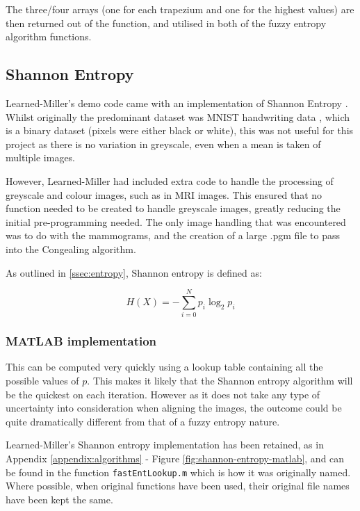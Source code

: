 The three/four arrays (one for each trapezium and one for the highest values) are then returned out of the function, and utilised in both of the fuzzy entropy algorithm functions.

\newpage
\subsection{Shannon Entropy}
\label{ssec:shannon-entropy}

Learned-Miller's demo code came with an implementation of Shannon Entropy \cite{joint-alignment}. Whilst originally the predominant dataset was MNIST handwriting data \cite{lecun1998gradientbased}, which is a binary dataset (pixels were either black or white), this was not useful for this project as there is no variation in greyscale, even when a mean is taken of multiple images.

However, Learned-Miller had included extra code to handle the processing of greyscale and colour images, such as in MRI images. This ensured that no function needed to be created to handle greyscale images, greatly reducing the initial pre-programming needed. The only image handling that was encountered was to do with the mammograms, and the creation of a large .pgm file to pass into the \Gls{Congealing} algorithm.

As outlined in \ref{ssec:entropy}, Shannon entropy is defined as:

\begin{equation}
  H(X) = - \displaystyle\sum_{i=0}^{N}{p_i \log_2 p_i}
\end{equation}

\subsubsection{MATLAB implementation}

This can be computed very quickly using a lookup table containing all the possible values of $p$. This makes it likely that the Shannon entropy algorithm will be the quickest on each iteration. However as it does not take any type of uncertainty into consideration when aligning the images, the outcome could be quite dramatically different from that of a fuzzy entropy nature.

Learned-Miller's Shannon entropy implementation has been retained, as in Appendix \ref{appendix:algorithms} - Figure \ref{fig:shannon-entropy-matlab}, and can be found in the function \texttt{fastEntLookup.m} which is how it was originally named. Where possible, when original functions have been used, their original file names have been kept the same.

